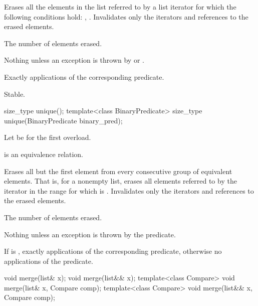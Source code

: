 \begin{itemdescr}
\pnum
\effects
Erases all the elements in the list referred to by a list iterator  for which the
following conditions hold: , .
Invalidates only the iterators and references to the erased elements.

\pnum
\returns
The number of elements erased.

\pnum
\throws
Nothing unless an exception is thrown by
or
.

\pnum
\complexity
Exactly
applications of the corresponding predicate.

\pnum
\remarks
Stable.
\end{itemdescr}

%
\begin{itemdecl}
size_type unique();
template<class BinaryPredicate> size_type unique(BinaryPredicate binary_pred);
\end{itemdecl}

\begin{itemdescr}
\pnum
Let  be  for the first overload.

\pnum
\expects
{} is an equivalence relation.

\pnum
\effects
Erases all but the first element from every
consecutive group of equivalent elements.
That is, for a nonempty list, erases all elements referred to
by the iterator  in the range 
for which  is .
Invalidates only the iterators and references to the erased elements.

\pnum
\returns
The number of elements erased.

\pnum
\throws
Nothing unless an exception is thrown by the predicate.

\pnum
\complexity
If  is ,
exactly  applications of the corresponding predicate,
otherwise no applications of the predicate.
\end{itemdescr}

%
\begin{itemdecl}
void merge(list& x);
void merge(list&& x);
template<class Compare> void merge(list& x, Compare comp);
template<class Compare> void merge(list&& x, Compare comp);
\end{itemdecl}

